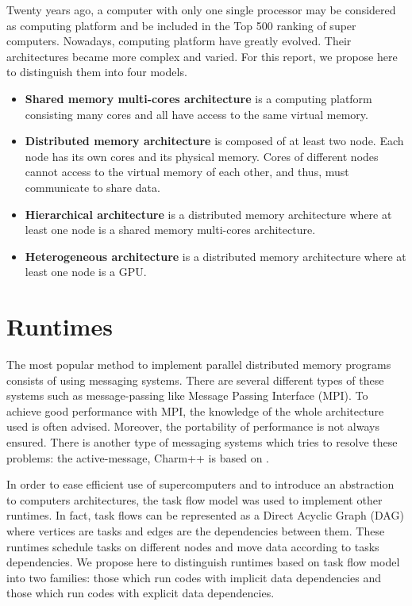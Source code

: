 Twenty years ago, a computer with only one single processor may be considered as computing platform and be included in the Top 500 ranking of super computers. Nowadays, computing platform have greatly evolved. Their architectures became more complex and varied. For this report, we propose here to distinguish them into four models.
\begin{itemize}
\item \textbf{Shared memory multi-cores architecture} is a computing platform consisting many cores and all have access to the same virtual memory.
\item \textbf{Distributed memory architecture} is composed of at least two node. Each node has its own cores and its physical memory. Cores of different nodes cannot access to the virtual memory of each other, and thus, must communicate to share data.
\item \textbf{Hierarchical architecture} is a distributed memory architecture where at least one node is a shared memory multi-cores architecture.
\item \textbf{Heterogeneous architecture} is a distributed memory architecture where at least one node is a GPU.
\end{itemize}

\section{Runtimes}
The most popular method to implement parallel distributed memory programs consists of using messaging systems. There are several different types of these systems such as message-passing like Message Passing Interface (MPI)\cite{Message94}. To achieve good performance with MPI, the knowledge of the whole architecture used is often advised. Moreover, the portability of performance is not always ensured. There is another type of messaging systems which tries to resolve these problems: the active-message, Charm++ is based on \cite{KaleLVandK1993b}.

In order to ease efficient use of supercomputers and to introduce an abstraction to computers architectures, the task flow model was used to implement other runtimes. In fact, task flows can be represented as a Direct Acyclic Graph (DAG) where vertices are tasks and edges are the dependencies between them. These runtimes schedule tasks on different nodes and move data according to tasks dependencies.
We propose here to distinguish runtimes based on task flow model into two families: those which run codes with implicit data dependencies and those which run codes with explicit data dependencies.

